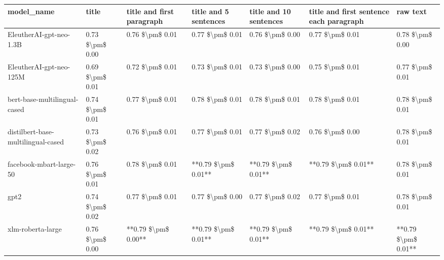\begin{tabular}{lllllll}
\toprule
                        model\_name &           title & title and first paragraph & title and 5 sentences & title and 10 sentences & title and first sentence each paragraph &            raw text \\
\midrule
           EleutherAI-gpt-neo-1.3B & 0.73 \$\textbackslash pm\$ 0.00 &           0.76 \$\textbackslash pm\$ 0.01 &       0.77 \$\textbackslash pm\$ 0.01 &        0.76 \$\textbackslash pm\$ 0.00 &                         0.77 \$\textbackslash pm\$ 0.01 &     0.78 \$\textbackslash pm\$ 0.00 \\
           EleutherAI-gpt-neo-125M & 0.69 \$\textbackslash pm\$ 0.01 &           0.72 \$\textbackslash pm\$ 0.01 &       0.73 \$\textbackslash pm\$ 0.01 &        0.73 \$\textbackslash pm\$ 0.00 &                         0.75 \$\textbackslash pm\$ 0.01 &     0.77 \$\textbackslash pm\$ 0.01 \\
      bert-base-multilingual-cased & 0.74 \$\textbackslash pm\$ 0.01 &           0.77 \$\textbackslash pm\$ 0.01 &       0.78 \$\textbackslash pm\$ 0.01 &        0.78 \$\textbackslash pm\$ 0.01 &                         0.78 \$\textbackslash pm\$ 0.01 &     0.78 \$\textbackslash pm\$ 0.01 \\
distilbert-base-multilingual-cased & 0.73 \$\textbackslash pm\$ 0.02 &           0.76 \$\textbackslash pm\$ 0.01 &       0.77 \$\textbackslash pm\$ 0.01 &        0.77 \$\textbackslash pm\$ 0.02 &                         0.76 \$\textbackslash pm\$ 0.00 &     0.78 \$\textbackslash pm\$ 0.01 \\
           facebook-mbart-large-50 & 0.76 \$\textbackslash pm\$ 0.01 &           0.78 \$\textbackslash pm\$ 0.01 &   **0.79 \$\textbackslash pm\$ 0.01** &    **0.79 \$\textbackslash pm\$ 0.01** &                     **0.79 \$\textbackslash pm\$ 0.01** &     0.78 \$\textbackslash pm\$ 0.01 \\
                              gpt2 & 0.74 \$\textbackslash pm\$ 0.02 &           0.77 \$\textbackslash pm\$ 0.01 &       0.77 \$\textbackslash pm\$ 0.00 &        0.77 \$\textbackslash pm\$ 0.02 &                         0.77 \$\textbackslash pm\$ 0.01 &     0.78 \$\textbackslash pm\$ 0.01 \\
                 xlm-roberta-large & 0.76 \$\textbackslash pm\$ 0.00 &       **0.79 \$\textbackslash pm\$ 0.00** &   **0.79 \$\textbackslash pm\$ 0.01** &    **0.79 \$\textbackslash pm\$ 0.01** &                     **0.79 \$\textbackslash pm\$ 0.01** & **0.79 \$\textbackslash pm\$ 0.01** \\
\bottomrule
\end{tabular}
